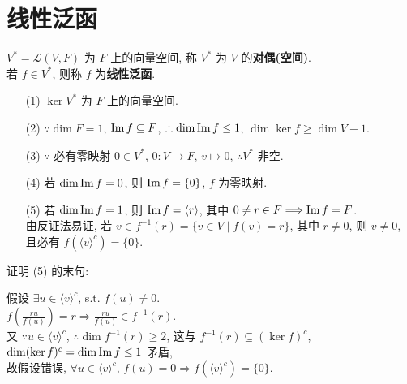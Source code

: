 \documentclass{note}
\begin{document}
\section{线性泛函}
\begin{df}[对偶(空间)和线性泛函]
    $V^*=\mathcal{L}(V,F)$ 为 $F$ 上的向量空间, 称 $V^*$ 为 $V$ 的\textbf{对偶(空间)}.\\
    若 $f\in V^*$, 则称 $f$ 为\textbf{线性泛函}.
\end{df}

\begin{itemize}
    \item[(1)] $\ker V^*$ 为 $F$ 上的向量空间.
    \item[(2)] $\because\dim F=1$, $\operatorname{Im} f\subseteq F$, $\therefore\dim\operatorname{Im} f\leq 1$, $\dim\ker f\geq\dim V-1$.
    \item[(3)] $\because$ 必有零映射 $0\in V^*$, $0:V\rightarrow F$, $v\mapsto 0$, $\therefore V^*$ 非空.
    \item[(4)] 若 $\dim\operatorname{Im} f=0$, 则 $\operatorname{Im} f=\{0\}$, $f$ 为零映射.
    \item[(5)] 若 $\dim\operatorname{Im} f=1$, 则 $\operatorname{Im} f=\langle r\rangle$, 其中 $0\neq r\in F\Longrightarrow\operatorname{Im} f=F$.\\
    由反证法易证, 若 $v\in f^{-1}(r)=\{v\in V\mid f(v)=r\}$, 其中 $r\neq 0$, 则 $v\neq 0$, 且必有 $f(\langle v\rangle^c)=\{0\}$.
\end{itemize}
证明 (5) 的末句:
\begin{pf}
    假设 $\exists u\in\langle v\rangle^c$, s.t. $f(u)\neq 0$.\\
    $f\left(\frac{ru}{f(u)}\right)=r\Longrightarrow\frac{ru}{f(u)}\in f^{-1}(r)$.\\
    又 $\because u\in\langle v\rangle^c$, $\therefore\dim f^{-1}(r)\geq 2$, 这与 $f^{-1}(r)\subseteq(\ker f)^c$, $\dim(\ker f)^c=\dim\operatorname{Im} f\leq 1$ 矛盾,\\
    故假设错误, $\forall u\in\langle v\rangle^c$, $f(u)=0\Longrightarrow f(\langle v\rangle^c)=\{0\}$.
\end{pf}
\end{document}
